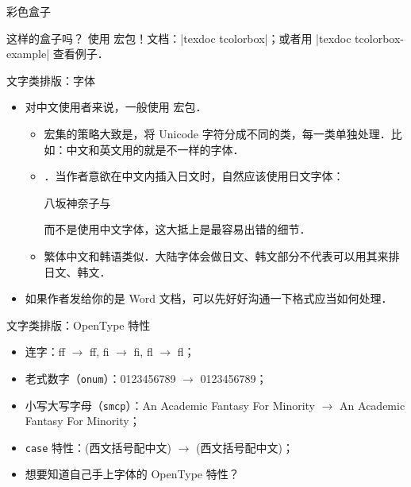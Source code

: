 \begin{frame}[fragile]{彩色盒子}
	\begin{tcolorbox}[enhanced,title={\heiti 你想要},frame style image=blueshade.png,colback = 碧蓝!4]
		这样的盒子吗？
		\tcblower
		使用  宏包！文档：|texdoc tcolorbox|；或者用 |texdoc tcolorbox-example| 查看例子．
	\end{tcolorbox}
\end{frame}

\begin{frame}{文字类排版：字体}
	\begin{itemize}
		\item<+-> 对中文使用者来说，一般使用  宏包．
			\begin{itemize}
				\item \CTeX{} 宏集的策略大致是，将 Unicode 字符分成不同的类，每一类单独处理．比如：中文和英文用的就是不一样的字体．
				\item {}．当作者意欲在中文内插入日文时，自然应该使用日文字体：
				      \begin{center}
					      八坂神奈子\kern\ccwd 与\kern\ccwd {}
				      \end{center}
				      而不是使用中文字体，这大抵上是最容易出错的细节．
				\item 繁体中文和韩语类似．大陆字体会做日文、韩文部分不代表可以用其来排日文、韩文．
			\end{itemize}
		\item<+-> 如果作者发给你的是 Word 文档，可以先好好沟通一下格式应当如何处理．
	\end{itemize}
\end{frame}

\begin{frame}{文字类排版：OpenType 特性}
	\begin{itemize}[<+->]
		\item 连字：f{}f $\to $ ff, f{}i $\to $ fi, f{}l $\to $ fl；
		\item 老式数字（\texttt{onum}）：0123456789 $\to $ {0123456789}；
		\item 小写大写字母（\texttt{smcp}）：An Academic Fantasy For Minority $\to $ {An Academic Fantasy For Minority}；
		\item \texttt{case} 特性：{(西文括号配中文)} $\to $ (西文括号配中文)；
		\item 想要知道自己手上字体的 OpenType 特性？
	\end{itemize}
\end{frame}

